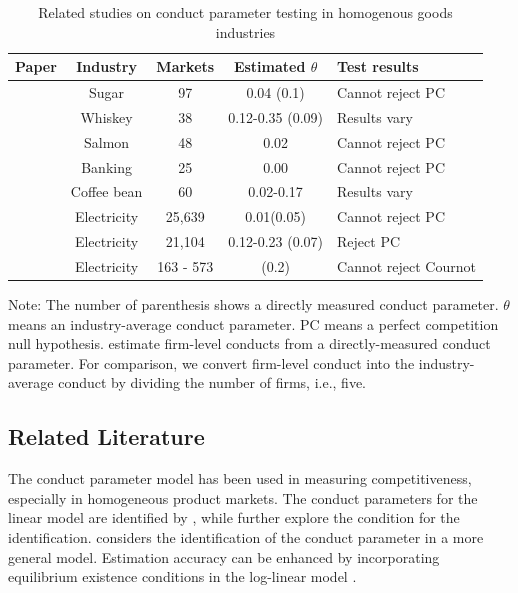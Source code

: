 \documentclass[11pt, a4paper]{article}
\begin{document}
\begin{table}[t!]
    \begin{adjustbox}{width=1\textwidth,center}
        \begin{tabular}{|l|c|c|c|l|}
        \hline
        \textbf{Paper} & \textbf{Industry} & \textbf{Markets} & \textbf{Estimated $\theta$} & \textbf{Test results} \\ \hline
        \cite{genesove1998testing} & Sugar & 97 & 0.04 (0.1)& Cannot reject PC \\ 
        \cite{clay2003further} & Whiskey & 38 & 0.12-0.35 (0.09) & Results vary \\ 
        \cite{steen1999testing} & Salmon & 48 & 0.02 & Cannot reject PC \\ 
        \cite{shaffer1993test} & Banking & 25 & 0.00 & Cannot reject PC \\
        \cite{bettendorf2000incomplete} & Coffee bean & 60 & 0.02-0.17 & Results vary  \\
        \cite{wolfram1999measuring} & Electricity & 25,639 & 0.01(0.05) & Cannot reject PC \\ 
        \cite{kim2006biases} & Electricity & 21,104 & 0.12-0.23 (0.07) & Reject PC \\ 
        \cite{puller2007pricing} & Electricity & 163 - 573 & (0.2) & Cannot reject Cournot \\ 
         \hline
        \end{tabular}
    \end{adjustbox}
    \caption{Related studies on conduct parameter testing in homogenous goods industries}
    \label{tab:conduct_parameter_testing_literature}
    \footnotesize
    \vspace{2mm}
    Note: The number of parenthesis shows a directly measured conduct parameter. $\theta$ means an industry-average conduct parameter. PC means a perfect competition null hypothesis. \cite{puller2007pricing} estimate firm-level conducts from a directly-measured conduct parameter. For comparison, we convert firm-level conduct into the industry-average conduct by dividing the number of firms, i.e., five.
\end{table}

\subsection{Related Literature}


The conduct parameter model has been used in measuring competitiveness, especially in homogeneous product markets.
The conduct parameters for the linear model are identified by \citet{bresnahan1982oligopoly}, while \cite{matsumura2023resolving} further explore the condition for the identification.
\citet{lau1982identifying} considers the identification of the conduct parameter in a more general model.
Estimation accuracy can be enhanced by incorporating equilibrium existence conditions in the log-linear model \citep{matsumura2024loglinear}. 
\end{document}
